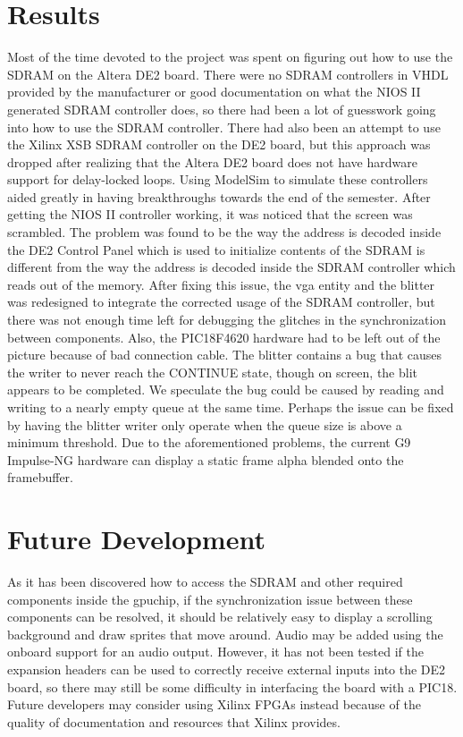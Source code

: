 \documentclass{report}
\begin{document}
\newpage
\section{Results}
Most of the time devoted to the project was spent on figuring out how to 
use the SDRAM on the Altera DE2 board. There were no SDRAM controllers 
in VHDL provided by the manufacturer or good documentation on what the 
NIOS II generated SDRAM controller does, so there had been a lot of 
guesswork going into how to use the SDRAM controller. There had also 
been an attempt to use the Xilinx XSB SDRAM controller on the DE2 board, 
but this approach was dropped after realizing that the Altera DE2 board 
does not have hardware support for delay-locked loops. Using ModelSim to 
simulate these controllers aided greatly in having breakthroughs towards 
the end of the semester. After getting the NIOS II controller working, 
it was noticed that the screen was scrambled. The problem was found to 
be the way the address is decoded inside the DE2 Control Panel which is 
used to initialize contents of the SDRAM is different from the way the 
address is decoded inside the SDRAM controller which reads out of the 
memory. After fixing this issue, the vga entity and the blitter was redesigned to 
integrate the corrected usage of the SDRAM controller, but there was not enough time 
left for debugging the glitches in the synchronization between 
components. Also, the PIC18F4620 hardware had to be left out of the 
picture because of bad connection cable. The blitter contains a bug that 
causes the writer to never reach the CONTINUE state, though on screen, 
the blit appears to be completed. We speculate the bug could be caused 
by reading and writing to a nearly empty queue at the same time.  
Perhaps the issue can be fixed by having the blitter writer only operate 
when the queue size is above a minimum threshold. Due to the 
aforementioned problems, the current G9 Impulse-NG hardware can display 
a static frame alpha blended onto the framebuffer.

\section{Future Development}
As it has been discovered how to access the SDRAM and other required 
components inside the gpuchip, if the synchronization issue between 
these components can be resolved, it should be relatively easy to 
display a scrolling background and draw sprites that move around. Audio 
may be added using the onboard support for an audio output. However, it 
has not been tested if the expansion headers can be used to correctly 
receive external inputs into the DE2 board, so there may still be some 
difficulty in interfacing the board with a PIC18. Future developers may
consider using Xilinx FPGAs instead because of the quality of documentation
and resources that Xilinx provides.

\clearpage
{}
{}
\nocite{website:dualport}
\nocite{website:dualport}
\nocite{website:XSA}
\nocite{website:XSB}
\nocite{website:DE2}
\nocite{website:Avalon}
\nocite{website:PLL}
\nocite{website:G9Impulse}
\nocite{website:Using}



\end{document}
